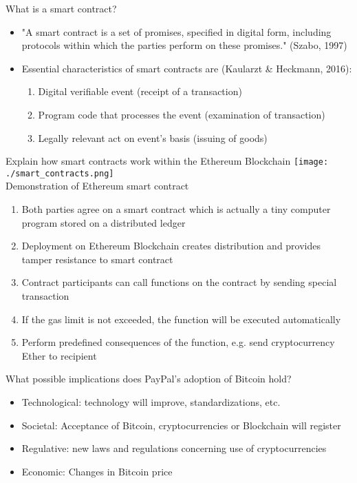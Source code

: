 \documentclass{article}
\begin{document}
What is a smart contract?
\begin{itemize}
    \item "A smart contract is a set of promises, specified in digital form, including protocols within which the parties perform on these promises." (Szabo, 1997)
    \item Essential characteristics of smart contracts are (Kaularzt \& Heckmann, 2016):
          \begin{enumerate}
              \item Digital verifiable event (receipt of a transaction)
              \item Program code that processes the event (examination of transaction)
              \item Legally relevant act on event's basis (issuing of goods)
          \end{enumerate}
\end{itemize}
Explain how smart contracts work within the Ethereum Blockchain \newline
\texttt{[image: ./smart\_contracts.png]}\\
Demonstration of Ethereum smart contract
\begin{enumerate}
    \item Both parties agree on a smart contract which is actually a tiny computer program stored on a distributed ledger
    \item Deployment on Ethereum Blockchain creates distribution and provides tamper resistance to smart contract
    \item Contract participants can call functions on the contract by sending special transaction
    \item If the gas limit is not exceeded, the function will be executed automatically
    \item Perform predefined consequences of the function, e.g. send cryptocurrency Ether to recipient
\end{enumerate}
What possible implications does PayPal's adoption of Bitcoin hold?
\begin{itemize}
    \item Technological: technology will improve, standardizations, etc.
    \item Societal: Acceptance of Bitcoin, cryptocurrencies or Blockchain will register
    \item Regulative: new laws and regulations concerning use of cryptocurrencies
    \item Economic: Changes in Bitcoin price
\end{itemize}
\end{document}
